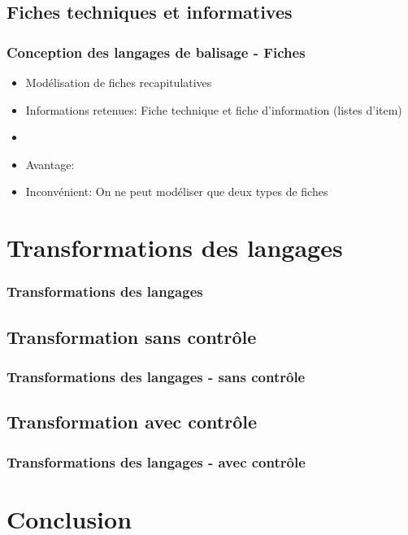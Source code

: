 \documentclass[10pt, compress]{beamer}
\begin{document}
\subsection{Fiches techniques et informatives}
\begin{frame}[fragile]
 \frametitle{Conception des langages de balisage - Fiches}
 \begin{itemize}[<+->]
  [square]
    \item{Modélisation de fiches recapitulatives}
    \item{Informations retenues: Fiche technique et fiche d'information (listes d'item)}
    \item{}
    \item{Avantage: }
    \item{Inconvénient: On ne peut modéliser que deux types de fiches}
  \end{itemize}
\end{frame}
\section{Transformations des langages}
\begin{frame}[fragile]
 \frametitle{Transformations des langages}
\end{frame}

\subsection{Transformation sans contrôle}
\begin{frame}[fragile]
 \frametitle{Transformations des langages - sans contrôle}
\end{frame}

\subsection{Transformation avec contrôle}
\begin{frame}[fragile]
 \frametitle{Transformations des langages - avec contrôle}
\end{frame}
\section{Conclusion}
\begin{frame}[fragile]
\end{frame}
\end{document}
